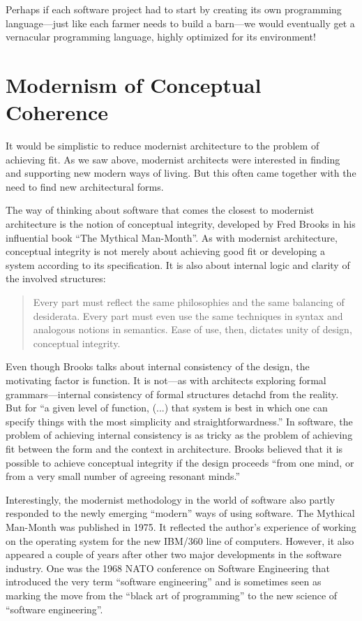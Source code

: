 Perhaps if each software project had to start by creating its own programming language---just
like each farmer needs to build a barn---we would eventually get a vernacular programming
language, highly optimized for its environment!

\section{Modernism of Conceptual Coherence}

It would be simplistic to reduce modernist architecture to the problem of achieving fit.
As we saw above, modernist architects were interested in finding and supporting new modern ways
of living. But this often came together with the need to find new architectural forms.

The way of thinking about software that comes the closest to modernist architecture is
the notion of conceptual integrity, developed by Fred Brooks in his influential book
``The Mythical Man-Month''. As with modernist architecture, conceptual integrity
is not merely about achieving good fit or developing a system according to its specification.
It is also about internal logic and clarity of the involved structures:

\begin{quote}
Every part must reflect the same philosophies and the same balancing of de\-siderata.
Every part must even use the same techniques in syntax and analogous notions in semantics.
Ease of use, then, dictates unity of design, conceptual integrity.
\end{quote}

Even though Brooks talks about internal consistency of the design, the motivating factor
is function. It is not---as with architects exploring formal grammars---internal consistency
of formal structures detachd from the reality. But for ``a given level of function, (...) that
system is best in which one can specify things with the most simplicity and
straightforwardness.''
In software, the problem of achieving internal consistency is as tricky as the problem of achieving
fit between the form and the context in architecture. Brooks believed that it is possible to
achieve conceptual integrity if the design proceeds ``from one mind, or from a very small number
of agreeing resonant minds.''

Interestingly, the modernist methodology in the world of software also partly responded to
the newly emerging ``modern'' ways of using software. The Mythical Man-Month was published
in 1975. It reflected the author's experience of working on the operating system for the
new IBM/360 line of computers. However, it also appeared a couple of years after other two
major developments in the software industry. One was the 1968 NATO conference on Software
Engineering that introduced the very term ``software engineering'' and is sometimes seen as
marking the move from the ``black art of programming'' to the new science of ``software
engineering''.

